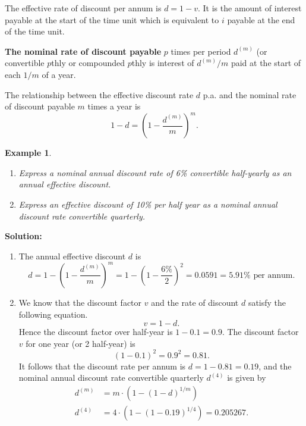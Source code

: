 \documentclass[
]{book}
\theoremstyle{definition}
\theoremstyle{definition}
\newtheorem{example}{Example}[chapter]
\theoremstyle{definition}
\theoremstyle{definition}
\theoremstyle{remark}
\begin{document}
The effective rate of discount per annum is \(d = 1 -v\). It is the amount
of interest payable at the start of the time unit which is equivalent to
\(i\) payable at the end of the time unit.

\textbf{The nominal rate of discount payable} \(p\) times per period \(d^{(m)}\)
(or convertible \(p\)thly or compounded \(p\)thly is interest of \(d^{(m)}/m\)
paid at the start of each \(1/m\) of a year.

The relationship between the effective discount rate \(d\) p.a. and the
nominal rate of discount payable \(m\) times a year is
\[1 - d = \left(1 - \frac{d^{(m)}}{m}\right)^m.\]

\begin{example}

\begin{enumerate}
\def\labelenumi{\arabic{enumi}.}
\item
  \emph{Express a nominal annual discount rate of 6\% convertible
  half-yearly as an annual effective discount.}
\item
  \emph{Express an effective discount of 10\% per half year as a nominal
  annual discount rate convertible quarterly.}
\end{enumerate}

\end{example}

\textbf{Solution:}

\begin{enumerate}
\def\labelenumi{\arabic{enumi}.}
\item
  The annual effective discount \(d\) is
  \[d = 1-  \left(1 - \frac{d^{(m)}}{m}\right)^m = 1-  \left(1 - \frac{6\%}{2}\right)^2 = 0.0591 = 5.91\% \text{ per annum}.\]
\item
  We know that the discount factor \(v\) and the rate of discount \(d\)
  satisfy the following equation. \[v =  1- d.\] Hence the discount
  factor over half-year is \(1 - 0.1 = 0.9\). The discount factor \(v\)
  for one year (or 2 half-year) is \[(1-0.1)^2 = 0.9^2 = 0.81.\] It
  follows that the discount rate per annum is \(d = 1- 0.81 = 0.19\),
  and the nominal annual discount rate convertible quarterly \(d^{(4)}\)
  is given by \[\begin{aligned}
       d^{(m)} &= m \cdot \left( 1-      (1 - d)^{1/m}  \right) \\
       d^{(4)} &= 4 \cdot \left( 1-      (1 - 0.19)^{1/4}  \right) = 0.205267.
      \end{aligned}\]
\end{enumerate}
\end{document}
